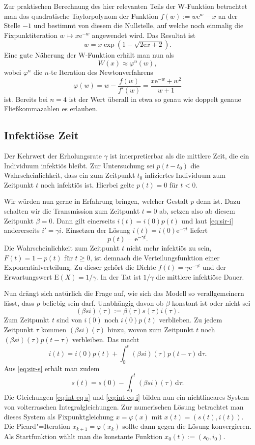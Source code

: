 \documentclass[a4paper,10pt,fleqn,twocolumn,twoside,dvipdfmx]{scrartcl}
\numberwithin{equation}{section}
\newcommand{\ee}{\mathrm e}
\begin{document}
Zur praktischen Berechnung des hier relevanten Teils der W-Funktion
betrachtet man das quadratische Taylorpolynom der
Funktion $f(w):=w\ee^w-x$ an der Stelle $-1$ und
bestimmt von diesem die Nullstelle, auf welche noch einmalig die
Fixpunktiteration $w\mapsto x\ee^{-w}$ angewendet
wird. Das Resultat ist
\[w = x\exp(1-\sqrt{2\ee x+2}).\]
Eine gute Näherung der W-Funktion erhält man nun als
\[W(x)\approx \varphi^n(w),\]
wobei $\varphi^n$ die $n$-te Iteration des Newtonverfahrens
\[\varphi(w) = w-\frac{f(w)}{f'(w)} = \frac{x\ee^{-w}+w^2}{w+1}\]
ist. Bereits bei $n=4$ ist der Wert überall in etwa so genau wie
doppelt genaue Fließkommazahlen es erlauben.

\subsection{Infektiöse Zeit}

Der Kehrwert der Erholungsrate $\gamma$ ist interpretierbar
als die mittlere Zeit, die ein Individuum infektiös bleibt. Zur
Untersuchung sei $p(t-t_0)$ die Wahrscheinlichkeit, dass ein zum Zeitpunkt
$t_0$ infiziertes Individuum zum Zeitpunkt $t$ noch infektiös ist.
Hierbei gelte $p(t)=0$ für $t<0$.

Wir würden nun gerne in Erfahrung bringen, welcher Gestalt $p$
denn ist. Dazu schalten wir die Transmission zum Zeitpunkt $t=0$
ab, setzen also ab diesem Zeitpunkt $\beta=0$. Dann gilt einerseits
$i(t)=i(0)p(t)$ und laut \eqref{eq:sir-i} andererseits
$i'=\gamma i$. Einsetzen der Lösung $i(t)=i(0)\ee^{-\gamma t}$
liefert%
\begin{equation}
p(t) = \ee^{-\gamma t}.
\end{equation}
Die Wahrscheinlichkeit zum Zeitpunkt $t$ nicht mehr infektiös zu sein,
$F(t)=1-p(t)$ für $t\ge 0$, ist demnach
die Verteilungsfunktion einer Exponentialverteilung.
Zu dieser gehört die Dichte
$f(t)=\gamma\ee^{-\gamma t}$ und der Erwartungswert
$\mathrm E(X) = 1/\gamma$. In der Tat ist $1/\gamma$ die mittlere
infektiöse Dauer.

Nun drängt sich natürlich die Frage auf, wie sich das Modell so
verallgemeinern lässt, dass $p$ beliebig sein darf.
Unabhängig davon ob $\beta$ konstant ist oder nicht sei
\[(\beta si)(\tau) := \beta(\tau)s(\tau)i(\tau).\]
Zum Zeitpunkt $t$ sind von $i(0)$ noch $i(0)p(t)$ verblieben.
Zu jedem Zeitpunkt $\tau$ kommen $(\beta si)(\tau)$ hinzu,
wovon zum Zeitpunkt $t$ noch $(\beta si)(\tau)p(t-\tau)$ verbleiben.
Das macht%
\begin{equation}\label{eq:int-eq-i}
i(t) = i(0)p(t) + \int_0^t (\beta si)(\tau)p(t-\tau)\,\mathrm d\tau.
\end{equation}
Aus \eqref{eq:sir-s} erhält man zudem
\begin{equation}\label{eq:int-eq-s}
s(t) = s(0) - \int_0^t (\beta si)(\tau)\,\mathrm d\tau.
\end{equation}
Die Gleichungen \eqref{eq:int-eq-s} und \eqref{eq:int-eq-i}
bilden nun ein nichtlineares System von volterraschen
Integralgleichungen. Zur numerischen
Lösung betrachtet man dieses System als Fixpunktgleichung
$x=\varphi(x)$ mit $x(t)=(s(t),i(t))$. Die Picard"=Iteration
$x_{k+1} = \varphi(x_k)$ sollte dann gegen die Lösung konvergieren.
Als Startfunktion wählt man die konstante Funktion
$x_0(t) := (s_0,i_0)$.
\end{document}
